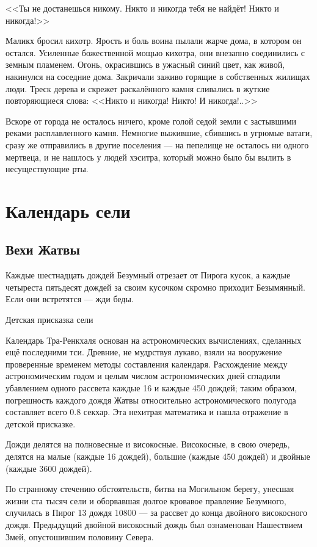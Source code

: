 <<Ты не достанешься никому.
Никто и никогда тебя не найдёт!
Никто и никогда!>>

Маликх бросил кихотр.
Ярость и боль воина пылали жарче дома, в котором он остался.
Усиленные божественной мощью кихотра, они внезапно соединились с земным пламенем.
Огонь, окрасившись в ужасный синий цвет, как живой, накинулся на соседние дома.
Закричали заживо горящие в собственных жилищах люди.
Треск дерева и скрежет раскалённого камня сливались в жуткие повторяющиеся слова: <<Никто и никогда!
Никто!
И никогда!..>>

Вскоре от города не осталось ничего, кроме голой седой земли с застывшими реками расплавленного камня.
Немногие выжившие, сбившись в угрюмые ватаги, сразу же отправились в другие поселения --- на пепелище не осталось ни одного мертвеца, и не нашлось у людей хэситра, который можно было бы вылить в несуществующие рты.

\appendix

\chapter{Календарь сели}

\section*{Вехи Жатвы}

\epigraph
{Каждые шестнадцать дождей Безумный отрезает от Пирога кусок, а каждые четыреста пятьдесят дождей за своим кусочком скромно приходит Безымянный.
Если они встретятся --- жди беды.}
{Детская присказка сели}

Календарь Тра-Ренкхаля основан на астрономических вычислениях, сделанных ещё последними тси.
Древние, не мудрствуя лукаво, взяли на вооружение проверенные временем методы составления календаря.
Расхождение между астрономическим годом и целым числом астрономических дней сгладили убавлением одного рассвета каждые 16 и каждые 450 дождей;
таким образом, погрешность каждого дождя Жатвы относительно астрономического полугода составляет всего 0.8 секхар.
Эта нехитрая математика и нашла отражение в детской присказке.

Дожди делятся на полновесные и високосные.
Високосные, в свою очередь, делятся на малые (каждые 16 дождей), большие (каждые 450 дождей) и двойные (каждые 3600 дождей).

По странному стечению обстоятельств, битва на Могильном берегу, унесшая жизни ста тысяч сели и оборвавшая долгое кровавое правление Безумного, случилась в Пирог 13 дождя 10800 --- за рассвет до конца двойного високосного дождя.
Предыдущий двойной високосный дождь был ознаменован Нашествием Змей, опустошившим половину Севера.

